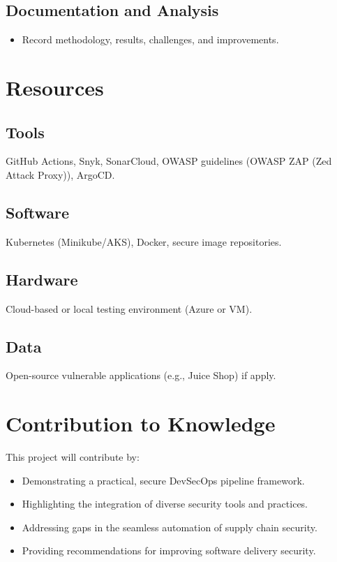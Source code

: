 \documentclass[a4paper,12pt]{article}
\begin{document}
\subsection*{Documentation and Analysis}
\begin{itemize}
    \item Record methodology, results, challenges, and improvements.
\end{itemize}

\section{Resources}
\subsection*{Tools}
GitHub Actions, Snyk, SonarCloud, OWASP guidelines (OWASP ZAP (Zed Attack Proxy)), ArgoCD.

\subsection*{Software}
Kubernetes (Minikube/AKS), Docker, secure image repositories.

\subsection*{Hardware}
Cloud-based or local testing environment (Azure or VM).

\subsection*{Data}
Open-source vulnerable applications (e.g., Juice Shop) if apply.

\section{Contribution to Knowledge}
This project will contribute by:
\begin{itemize}
    \item Demonstrating a practical, secure DevSecOps pipeline framework.
    \item Highlighting the integration of diverse security tools and practices.
    \item Addressing gaps in the seamless automation of supply chain security.
    \item Providing recommendations for improving software delivery security.
\end{itemize}
\end{document}
